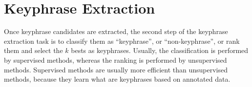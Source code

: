 
\section{Keyphrase Extraction}
\label{sec:keyphrase_extraction}
  Once keyphrase candidates are extracted, the second step of the keyphrase
  extraction task is to classify them as ``keyphrase'', or ``non-keyphrase'', or
  rank them and select the $k$ bests as keyphrases. Usually, the classification
  is performed by supervised methods, whereas the ranking is performed by
  unsupervised methods. Supervised methods are usually more efficient than
  unsupervised methods, because they learn what are keyphrases based on
  annotated data.

